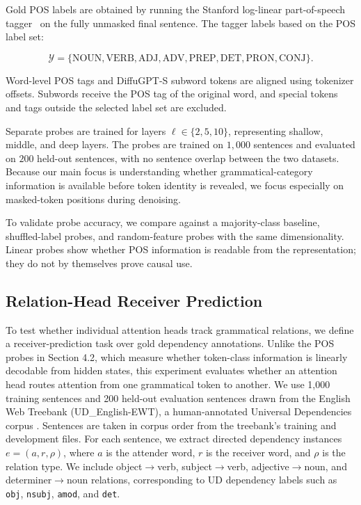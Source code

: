 \documentclass{article} %
\begin{document}
Gold POS labels are obtained by running the Stanford log-linear part-of-speech tagger~\citep{toutanova2003featurerich} on the fully unmasked final sentence. The tagger labels based on the POS label set:

\[
\mathcal{Y}=\{\mathrm{NOUN}, \mathrm{VERB}, \mathrm{ADJ}, \mathrm{ADV}, \mathrm{PREP}, \mathrm{DET}, \mathrm{PRON}, \mathrm{CONJ}\}.
\]

Word-level POS tags and DiffuGPT-S subword tokens are aligned using tokenizer offsets. Subwords receive the POS tag of the original word, and special tokens and tags outside the selected label set are excluded.

Separate probes are trained for layers \(\ell \in \{2,5,10\}\), representing shallow, middle, and deep layers. The probes are trained on $1{,}000$ sentences and evaluated on $200$ held-out sentences, with no sentence overlap between the two datasets. Because our main focus is understanding whether grammatical-category information is available before token identity is revealed, we focus especially on masked-token positions during denoising.

To validate probe accuracy, we compare against a majority-class baseline, shuffled-label probes, and random-feature probes with the same dimensionality. Linear probes show whether POS information is readable from the representation; they do not by themselves prove causal use.

\subsection{Relation-Head Receiver Prediction}

To test whether individual attention heads track grammatical relations, we define a receiver-prediction task over gold dependency annotations. Unlike the POS probes in Section 4.2, which measure whether token-class information is linearly decodable from hidden states, this experiment evaluates whether an attention head routes attention from one grammatical token to another. We use 1,000 training sentences and 200 held-out evaluation sentences drawn from the English Web Treebank (UD\_English-EWT), a human-annotated Universal Dependencies corpus \citep{nivre2020universal}. Sentences are taken in corpus order from the treebank's training and development files. For each sentence, we extract directed dependency instances $e=(a,r,\rho)$, where $a$ is the attender word, $r$ is the receiver word, and $\rho$ is the relation type. We include object$\rightarrow$verb, subject$\rightarrow$verb, adjective$\rightarrow$noun, and determiner$\rightarrow$noun relations, corresponding to UD dependency labels such as \texttt{obj}, \texttt{nsubj}, \texttt{amod}, and \texttt{det}.
\end{document}
